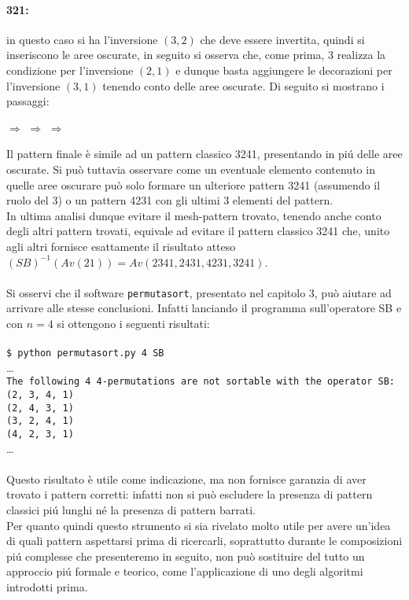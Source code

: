 \paragraph*{321:} in questo caso si ha l'inversione $(3,2)$ che deve essere invertita, quindi si inseriscono le aree oscurate, in seguito si osserva che, come prima, $3$ realizza la condizione per l'inversione $(2,1)$ e dunque basta aggiungere le decorazioni per l'inversione $(3,1)$ tenendo conto delle aree oscurate. Di seguito si mostrano i passaggi:
\begin{center}
$\Rightarrow$
$\Rightarrow$
$\Rightarrow$
\end{center}
Il pattern finale \`e simile ad un pattern classico 3241, presentando in pi\'u delle aree oscurate. Si pu\`o tuttavia osservare come un eventuale elemento contenuto in quelle aree oscurare pu\`o solo formare un ulteriore pattern 3241 (assumendo il ruolo del 3) o un pattern 4231 con gli ultimi 3 elementi del pattern.\\
In ultima analisi dunque evitare il mesh-pattern trovato, tenendo anche conto degli altri pattern trovati, equivale ad evitare il pattern classico 3241 che, unito agli altri fornisce esattamente il risultato atteso $(SB)^{-1}(Av(21))=Av(2341, 2431, 4231, 3241)$.\\\\
Si osservi che il software \texttt{permutasort}, presentato nel capitolo 3, pu\`o aiutare ad arrivare alle stesse conclusioni. Infatti lanciando il programma sull'operatore SB e con $n=4$ si ottengono i seguenti risultati:\\\\\texttt{\$ python permutasort.py 4 SB }\\\dots\\\texttt{The following 4 4-permutations are not sortable with the operator SB:}\\\texttt{(2, 3, 4, 1)}\\\texttt{(2, 4, 3, 1)}\\\texttt{(3, 2, 4, 1)}\\\texttt{(4, 2, 3, 1)}\\\dots\\\\
Questo risultato \`e utile come indicazione, ma non fornisce garanzia di aver trovato i pattern corretti: infatti non si pu\`o escludere la presenza di pattern classici pi\'u lunghi n\'e la presenza di pattern barrati.\\
Per quanto quindi questo strumento si sia rivelato molto utile per avere un'idea di quali pattern aspettarsi prima di ricercarli, soprattutto durante le composizioni pi\'u complesse che presenteremo in seguito, non pu\`o sostituire del tutto un approccio pi\'u formale e teorico, come l'applicazione di uno degli algoritmi introdotti prima.
